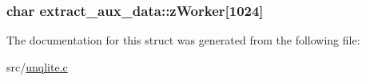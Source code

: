 \hypertarget{structextract__aux__data_a24d99c3fdc86b1338e9ad8ea6540a34b}{
\subsubsection[{z\-Worker}]{\setlength{\rightskip}{0pt plus 5cm}char extract\-\_\-aux\-\_\-data\-::z\-Worker\mbox{[}1024\mbox{]}}}\label{d3/ded/structextract__aux__data_a24d99c3fdc86b1338e9ad8ea6540a34b}


The documentation for this struct was generated from the following file\-:\begin{DoxyCompactItemize}
\item 
src/\hyperlink{unqlite_8c}{unqlite.\-c}\end{DoxyCompactItemize}
